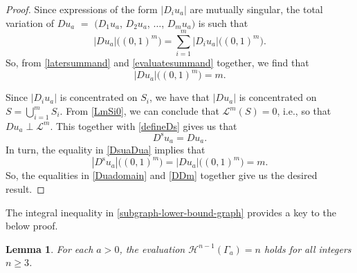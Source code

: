 \documentclass[10pt,a4paper]{amsart}
\newtheorem{lemma}{Lemma}%
\begin{document}
\begin{proof}
 Since expressions of the form $\left| D_{i} u_{a} \right|$ are mutually singular, the total variation of $ Du_a$ $ =$ $ \big( D_1u_a$, $D_2 u_a$, $ \ldots$, $ D_m u_a \big) $ 
 is such that 
\begin{equation}\label{evaluatesummand} 
 \left| Du_a \right|\big( (0, 1)^{m} \big) = \sum_{i=1}^{m} \left| D_i u_a \right|\big( (0, 1)^{m} \big). 
\end{equation}
 So, from \eqref{latersummand} and \eqref{evaluatesummand} together, we find that 
\begin{equation}\label{Duadomain} 
 \left| D u_a \right|\big( (0, 1)^{m} \big) = m. 
\end{equation}

 Since $\left| D_{i} u_{a} \right|$ is concentrated on $S_{i}$, we have that $\left| Du_a \right|$ is concentrated on $S = \bigcup_{i=1}^{m} S_{i}$. From \eqref{LmSi0}, we can 
 conclude that $\mathcal{L}^{m}(S) = 0$, i.e., so that $Du_a \perp \mathcal{L}^{m}$. This together with \eqref{defineDs} gives us that 
\begin{equation}\label{DsuaDua}
 D^{\operatorname{s}}u_a = Du_a. 
\end{equation}
 In turn, the equality in \eqref{DsuaDua} implies that 
\begin{equation}\label{DDm}
 \left| D^{\operatorname{s}} u_a \right|\big( (0, 1)^{m} \big) = \left| Du_a \right|\big( (0, 1)^{m} \big) = m. 
\end{equation}
 So, the equalities in \eqref{Duadomain} and \eqref{DDm} together give us the desired result. 
\end{proof}

 The integral inequality in \eqref{subgraph-lower-bound-graph} provides a key to the below proof. 

\begin{lemma}\label{beforetheorem}%
 For each $a > 0$, the evaluation $ \mathcal H^{n-1}(\Gamma_a)=n $ holds for all integers \(n\geq 3\).
\end{lemma}
\end{document}
